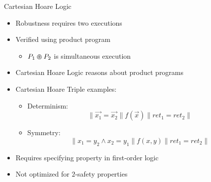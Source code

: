\documentclass[usenames,dvipsnames]{beamer}
\begin{document}
\begin{frame}{Cartesian Hoare Logic \cite{sousa16}}
    \begin{itemize}
        \item<1-> Robustness requires two executions
        \item<2-> Verified using product program
            \begin{itemize}
                \item<3-> \(P_{1} \varoast P_{2}\) is simultaneous execution
            \end{itemize}
        \item<4-> Cartesian Hoare Logic reasons about product programs
        \item<5-> Cartesian Hoare Triple examples:
            \begin{itemize}
                \item<6-> Determinism: \[\|\vec{x_{1}} = \vec{x_{2}}\|f(\vec{x})\|ret_{1} = ret_{2}\|\]
                \item<7-> Symmetry: \[\|x_{1} = y_{2} \wedge x_{2} = y_{1}\|f(x,y)\|ret_{1} = ret_{2}\|\]
            \end{itemize}
        \item<8-> Requires specifying property in first-order logic
        \item<9-> Not optimized for \(2\)-safety properties
    \end{itemize}
\end{frame}

\end{document}
